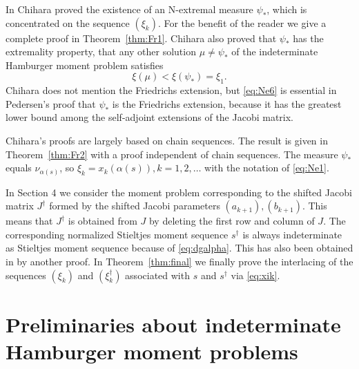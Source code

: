 \documentclass[12pt]{article}
\begin{document}
In \cite[Lemma 2]{Ch1} Chihara proved  the existence of an N-extremal measure
 $\psi_*$, which  is concentrated on the sequence $(\xi_k)$. For the benefit of the reader we give a complete proof in  Theorem~\ref{thm:Fr1}. Chihara also proved that $\psi_*$ has the extremality property, that any other solution $\mu\neq \psi_*$ of the indeterminate Hamburger moment problem satisfies
\begin{equation}\label{eq:Ne6}
\xi(\mu)<\xi(\psi_*)=\xi_1.
\end{equation} 
Chihara does not mention the Friedrichs extension, but \eqref{eq:Ne6} is essential in Pedersen's proof that $\psi_*$ is the Friedrichs extension, because
it has the greatest lower bound among the self-adjoint extensions of the Jacobi matrix.

Chihara's proofs are largely based on chain sequences. The result is given in  Theorem~\ref{thm:Fr2} with a proof independent of chain sequences.
The measure $\psi_*$ equals $\nu_{\alpha(s)}$, so $\xi_k=x_k(\alpha(s)), k=1,2,\ldots$ with the notation of \eqref{eq:Ne1}.

In Section 4 we consider the moment problem corresponding to the shifted Jacobi matrix
$J^\dagger$ formed by the shifted Jacobi parameters $(a_{k+1}), (b_{k+1})$. This means that $J^\dagger$ is obtained from $J$ by deleting the first row and column of $J$. The corresponding normalized Stieltjes moment sequence $s^\dagger$ is  always indeterminate as Stieltjes moment sequence because of \eqref{eq:dgalpha}. This has also been obtained in \cite[Theorem 4.3]{B0} by another  proof.  In Theorem~\ref{thm:final} we finally prove the interlacing of the sequences $(\xi_k)$ and $(\xi^\dagger_k)$ associated with $s$ and $s^\dagger$ via \eqref{eq:xik}.  
 
 
  
 
 
\section{Preliminaries about indeterminate Hamburger moment problems}
\end{document}
